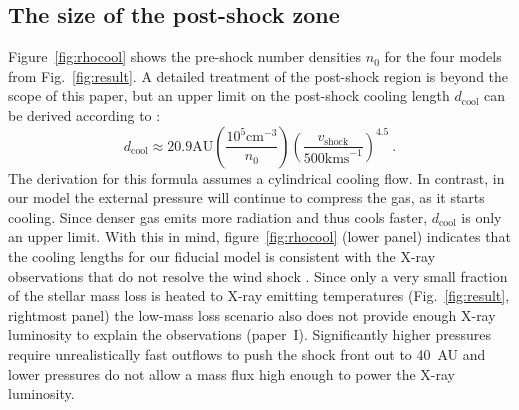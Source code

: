 \subsection{The size of the post-shock zone}
Figure~\ref{fig:rhocool} shows the pre-shock number densities $n_0$ for the four models from Fig.~\ref{fig:result}. A detailed treatment of the post-shock region is beyond the scope of this paper, but an upper limit on the post-shock cooling length $d_{\mathrm{cool}}$ can be derived according to \citet{2002ApJ...576L.149R}:
\begin{equation}
d_{\mathrm{cool}} \approx 20.9 \mathrm{ AU}
    \left(\frac{10^5\mathrm{ cm}^{-3}}{n_0}\right)
    \left(\frac{v_{\mathrm{shock}}}{500\mathrm{ km s}^{-1}}\right)^{4.5}\ .
\end{equation}
The derivation for this formula assumes a cylindrical cooling flow. In contrast, in our model the external pressure will continue to compress the gas, as it starts cooling. Since denser gas emits more radiation and thus cools faster, $d_{\mathrm{cool}}$ is only an upper limit. With this in mind, figure~\ref{fig:rhocool} (lower panel) indicates that the cooling lengths for our fiducial model is consistent with the X-ray observations that do not resolve the wind shock \citep{2008A&A...488L..13S}. Since only a very small fraction of the stellar mass loss is heated to X-ray emitting temperatures (Fig.~\ref{fig:result}, rightmost panel) the low-mass loss scenario also does not provide enough X-ray luminosity to explain the observations (paper~I).
Significantly higher pressures require unrealistically fast outflows to push the shock front out to 40~AU and lower pressures do not allow a mass flux high enough to power the X-ray luminosity.

